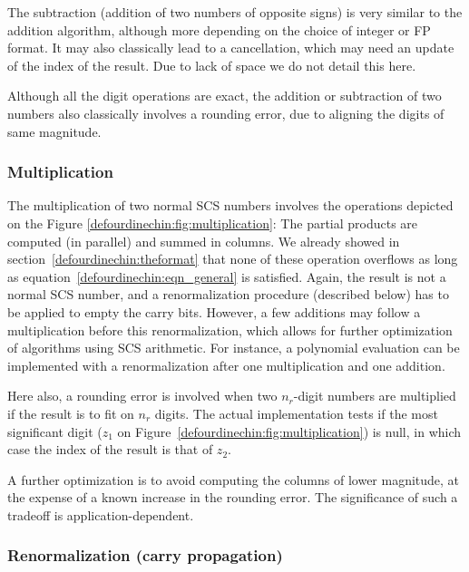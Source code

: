 The subtraction (addition of two numbers of opposite signs) is very
similar to the addition algorithm, although more depending on the
choice of integer or FP format. It may also classically lead to a
cancellation, which may need an update of the index of the result. Due
to lack of space we do not detail this here.

Although all the digit operations are exact, the addition or
subtraction of two numbers also classically involves a rounding error,
due to aligning the digits of same magnitude.




\subsubsection{Multiplication}

The multiplication of two normal SCS numbers involves the operations
depicted on the Figure \ref{defourdinechin:fig:multiplication}: The partial products
are computed (in parallel) and summed in columns. We already showed in
section~\ref{defourdinechin:theformat} that none of these operation overflows as long
as equation~\ref{defourdinechin:eqn_general} is satisfied. Again, the result is not a
normal SCS number, and a renormalization procedure (described below)
has to be applied to empty the carry bits. However, a few additions
may follow a multiplication before this renormalization, which allows
for further optimization of algorithms using SCS arithmetic. For
instance, a polynomial evaluation can be implemented with a
renormalization after one multiplication and one addition.

Here also, a rounding error is involved when two $n_r$-digit numbers
are multiplied if the result is to fit on $n_r$ digits. The actual
implementation tests if the most significant digit ($z_1$ on
Figure~\ref{defourdinechin:fig:multiplication}) is null, in which case the index of
the result is that of $z_2$.

A further optimization is to avoid computing the columns of lower
magnitude, at the expense of a known increase in the rounding error.
The significance of such a tradeoff is application-dependent.


\subsubsection{Renormalization (carry propagation) \label{defourdinechin:renorm}}

